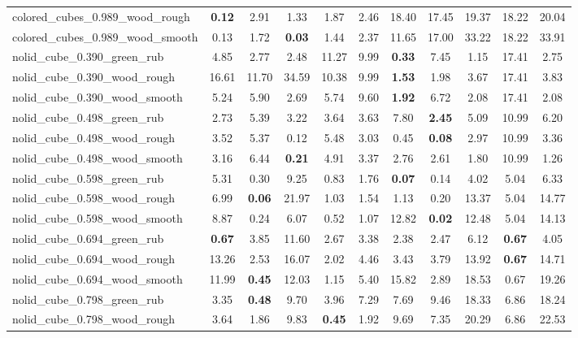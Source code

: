 \begin{table}[H]
{\begin{tabular}{l cccccccccc}
        colored\_cubes\_0.989\_wood\_rough & \textbf{0.12} & 2.91 & 1.33 & 1.87 & 2.46 & 18.40 & 17.45 & 19.37 & 18.22 & 20.04 \\
        colored\_cubes\_0.989\_wood\_smooth & 0.13 & 1.72 & \textbf{0.03} & 1.44 & 2.37 & 11.65 & 17.00 & 33.22 & 18.22 & 33.91 \\
        nolid\_cube\_0.390\_green\_rub & 4.85 & 2.77 & 2.48 & 11.27 & 9.99 & \textbf{0.33} & 7.45 & 1.15 & 17.41 & 2.75 \\
        nolid\_cube\_0.390\_wood\_rough & 16.61 & 11.70 & 34.59 & 10.38 & 9.99 & \textbf{1.53} & 1.98 & 3.67 & 17.41 & 3.83 \\
        nolid\_cube\_0.390\_wood\_smooth & 5.24 & 5.90 & 2.69 & 5.74 & 9.60 & \textbf{1.92} & 6.72 & 2.08 & 17.41 & 2.08 \\
        nolid\_cube\_0.498\_green\_rub & 2.73 & 5.39 & 3.22 & 3.64 & 3.63 & 7.80 & \textbf{2.45} & 5.09 & 10.99 & 6.20 \\
        nolid\_cube\_0.498\_wood\_rough & 3.52 & 5.37 & 0.12 & 5.48 & 3.03 & 0.45 & \textbf{0.08} & 2.97 & 10.99 & 3.36 \\
        nolid\_cube\_0.498\_wood\_smooth & 3.16 & 6.44 & \textbf{0.21} & 4.91 & 3.37 & 2.76 & 2.61 & 1.80 & 10.99 & 1.26 \\
        nolid\_cube\_0.598\_green\_rub & 5.31 & 0.30 & 9.25 & 0.83 & 1.76 & \textbf{0.07} & 0.14 & 4.02 & 5.04 & 6.33 \\
        nolid\_cube\_0.598\_wood\_rough & 6.99 & \textbf{0.06} & 21.97 & 1.03 & 1.54 & 1.13 & 0.20 & 13.37 & 5.04 & 14.77 \\
        nolid\_cube\_0.598\_wood\_smooth & 8.87 & 0.24 & 6.07 & 0.52 & 1.07 & 12.82 & \textbf{0.02} & 12.48 & 5.04 & 14.13 \\
        nolid\_cube\_0.694\_green\_rub & \textbf{0.67} & 3.85 & 11.60 & 2.67 & 3.38 & 2.38 & 2.47 & 6.12 & \textbf{0.67} & 4.05 \\
        nolid\_cube\_0.694\_wood\_rough & 13.26 & 2.53 & 16.07 & 2.02 & 4.46 & 3.43 & 3.79 & 13.92 & \textbf{0.67} & 14.71 \\
        nolid\_cube\_0.694\_wood\_smooth & 11.99 & \textbf{0.45} & 12.03 & 1.15 & 5.40 & 15.82 & 2.89 & 18.53 & 0.67 & 19.26 \\
        nolid\_cube\_0.798\_green\_rub & 3.35 & \textbf{0.48} & 9.70 & 3.96 & 7.29 & 7.69 & 9.46 & 18.33 & 6.86 & 18.24 \\
        nolid\_cube\_0.798\_wood\_rough & 3.64 & 1.86 & 9.83 & \textbf{0.45} & 1.92 & 9.69 & 7.35 & 20.29 & 6.86 & 22.53 \\

\end{tabular}}
\end{table}
